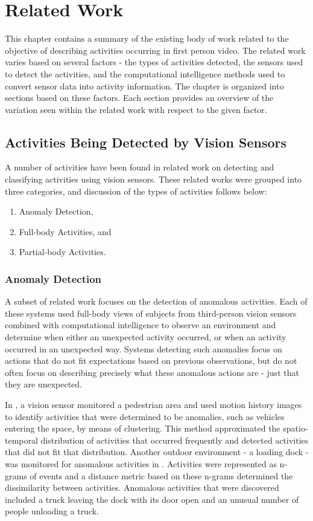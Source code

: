\documentclass[12pt]{report}
\begin{document}
\chapter{Related Work}
This chapter contains a summary of the existing body of work related to the objective of describing activities occurring in first person video. The related work varies based on several factors - the types of activities detected, the sensors used to detect the activities, and the computational intelligence methods used to convert sensor data into activity information. The chapter is organized into sections based on these factors. Each section provides an overview of the variation seen within the related work with respect to the given factor.

\section{Activities Being Detected by Vision Sensors}

A number of activities have been found in related work on detecting and classifying activities using vision sensors. These related works were grouped into three categories, and discussion of the types of activities follows below:
\begin{enumerate}
\item Anomaly Detection, 
\item Full-body Activities, and
\item Partial-body Activities.
\end{enumerate}

\subsection{Anomaly Detection}

A subset of related work focuses on the detection of anomalous activities. Each of these systems used full-body views of subjects from third-person vision sensors combined with computational intelligence to observe an environment and determine when either an unexpected activity occurred, or when an activity occurred in an unexpected way. Systems detecting such anomalies focus on actions that do not fit expectations based on previous observations, but do not often focus on describing precisely what these anomalous actions are - just that they are unexpected.

In \cite{Beleznai2012}, a vision sensor monitored a pedestrian area and used motion history images to identify activities that were determined to be anomalies, such as vehicles entering the space, by means of clustering. This method approximated the spatio-temporal distribution of activities that occurred frequently and detected activities that did not fit that distribution. Another outdoor environment - a loading dock - was monitored for anomalous activities in \cite{Hamid2005}. Activities were represented as n-grams of events and a distance metric based on these n-grams determined the dissimilarity between activities. Anomalous activities that were discovered included a truck leaving the dock with its door open and an unusual number of people unloading a truck. 
\end{document}
